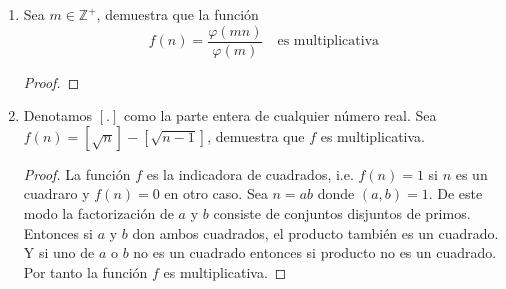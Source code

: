 \documentclass[letterpaper]{article}
\newcommand{\Z}{\mathbb{Z}}
\DeclareMathOperator{\lcm}{lcm}
\begin{document}
\begin{enumerate}
\begin{proof}
Sea $n=ab$ con $a, b \in \Z$ tal que $\gcd(a,b) = 1$ entonces,

\begin{align*}
    \gcd(m, ab)
        &= \gcd(m, \lcm(a, b))
            && \text{Como $\gcd(a,b) = 1$, entonces $\lcm(a,b) = ab$}\\
        &= \lcm(\gcd(m,a), \gcd(m,b))
            && \text{El $\gcd$ y $\lcm$ se distribuyen sobre cada uno}\\
        &= \frac{\gcd(m,a) \gcd(m,b)} {\gcd(\gcd(m,a) \gcd(m,b))}
            && \text{Producto del gcd con el lcm}\\
        &= \frac{\gcd(m,a) \gcd(m,b)} {\gcd(m,\gcd(a, \gcd(m,b)))}
            && \text{Máximo común divisor es asociativo}\\
            &= \frac{\gcd(m,a) \gcd(m,b)} {\gcd(m ,\gcd(\gcd(a,b),m))}
            && \text{Máximo común divisor es asociativo}\\
        &= \frac{\gcd(m,a) \gcd(m,b)} {\gcd(n, \gcd(1,n))}
            && \text{Por ser primos relativos}\\
        &= \frac{\gcd (m,a)(m,b)} {\gcd(m,1)}\\
        &= \frac{\gcd(m,a) \gcd(m,b)} {1}\\
        &= \gcd(m,a) \gcd(m,b)
\end{align*}
Ergo, el máximo común divisor con un argumento fijo es una función multiplicativa, i.e.

$$ f(ab) = \gcd(ab, m) = \gcd(a,m) \cdot \gcd(b,m) = f(a) \cdot f(b). $$
\end{proof}

\item Sea $m \in \Z^+$, demuestra que la función
\[ f(n) = \frac{\varphi(mn)}{\varphi(m)} \quad \text{es multiplicativa}\]
\begin{proof}
    \Large{\frownie}
\end{proof}

\item Denotamos $\left[.\right]$ como la parte entera de cualquier número real. Sea
$f(n)= \left[{\sqrt{n}}\right] - \left[{\sqrt{n-1}}\right]$, demuestra que $f$ es multiplicativa.
\begin{proof}
La función $f$ es la indicadora de cuadrados, i.e. $f(n) = 1$ si $n$ es un cuadraro y $f(n) = 0$ en otro caso.
Sea $n = ab$ donde $(a,b) = 1$. De este modo la factorización de $a$ y $b$ consiste de conjuntos disjuntos
de primos. Entonces si $a$ y $b$ don ambos cuadrados, el producto también es un cuadrado. Y si uno de
$a$ o $b$ no es un cuadrado entonces si producto no es un cuadrado. Por tanto la función $f$ es multiplicativa.
\end{proof}


\end{enumerate}
\end{document}
